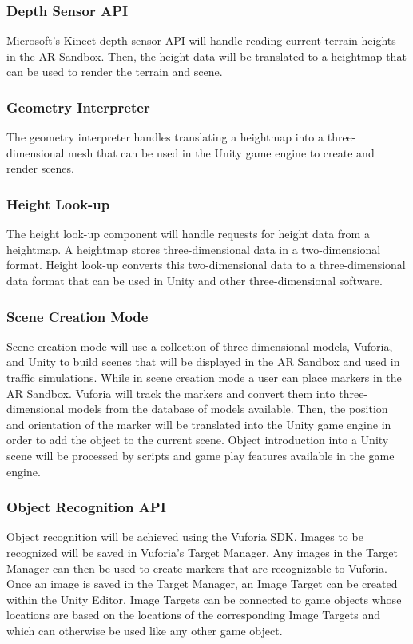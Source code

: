 \documentclass[letterpaper, 10pt, onecolumn, draftclsnofoot]{IEEEtran}
\begin{document}
        \subsubsection{Depth Sensor API}
            Microsoft's Kinect depth sensor API will handle reading current terrain heights in the AR Sandbox. Then, the height data will be  translated to a heightmap that can be used to render the terrain and scene.
       
        \subsubsection{Geometry Interpreter}
            The geometry interpreter handles translating a heightmap into a three-dimensional mesh that can be used in the Unity game engine to create and render scenes.  
        
        \subsubsection{Height Look-up}
            The height look-up component will handle requests for height data from a heightmap. A heightmap stores three-dimensional data in a two-dimensional format. Height look-up converts this two-dimensional data to a three-dimensional data format that can be used in Unity and other three-dimensional software.
       
        \subsubsection{Scene Creation Mode}
            Scene creation mode will use a collection of three-dimensional models, Vuforia, and Unity to build scenes that will be displayed in the AR Sandbox and used in traffic simulations. While in scene creation mode a user can place markers in the AR Sandbox. Vuforia will track the markers and convert them into three-dimensional models from the database of models available. Then, the position and orientation of the marker will be translated into the Unity game engine in order to add the object to the current scene. Object introduction into a Unity scene will be processed by scripts and game play features available in the game engine.
       
        \subsubsection{Object Recognition API}
            Object recognition will be achieved using the Vuforia SDK. Images to be recognized will be saved in Vuforia's Target Manager. Any images in the Target Manager can then be used to create markers that are recognizable to Vuforia. Once an image is saved in the Target Manager, an Image Target can be created within the Unity Editor. Image Targets can be connected to game objects whose locations are based on the locations of the corresponding Image Targets and which can otherwise be used like any other game object.
       
\end{document}
